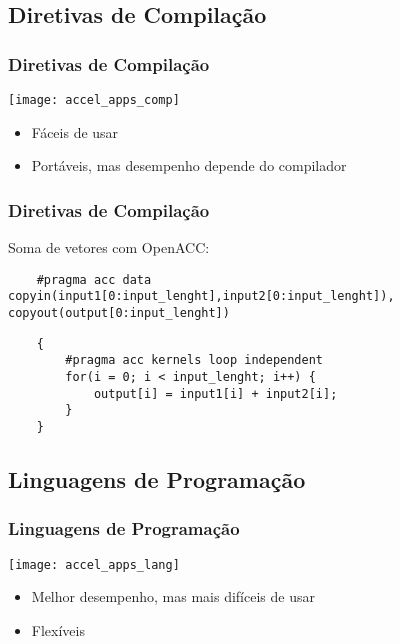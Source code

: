 \documentclass[10pt, compress]{beamer}
\begin{document}
\subsection{Diretivas de Compilação}

\begin{frame}
    \frametitle{Diretivas de Compilação}
    \begin{center}
        \texttt{[image: accel\_apps\_comp]}
    \end{center}

    \begin{itemize}
        \item Fáceis de usar
        \item Portáveis, mas desempenho depende do compilador
    \end{itemize}
\end{frame}

\begin{frame}[fragile]
    \frametitle{Diretivas de Compilação}
    Soma de vetores com \alert{OpenACC}:
    \begin{lstlisting}
    #pragma acc data copyin(input1[0:input_lenght],input2[0:input_lenght]), copyout(output[0:input_lenght])
    \end{lstlisting}
    \pause
    \begin{lstlisting}
    {
        #pragma acc kernels loop independent
        for(i = 0; i < input_lenght; i++) {
            output[i] = input1[i] + input2[i];
        }
    }
    \end{lstlisting}
\end{frame}

\subsection{Linguagens de Programação}

\begin{frame}
    \frametitle{Linguagens de Programação}
    \begin{center}
        \texttt{[image: accel\_apps\_lang]}
    \end{center}

    \begin{itemize}
        \item Melhor desempenho, mas mais difíceis de usar
        \item Flexíveis
    \end{itemize}
\end{frame}
\end{document}
